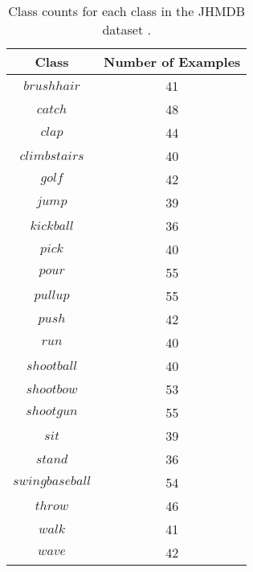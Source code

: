 \begin{table}[ht]
	\centering
	\begin{tabular}{||c c||} 
		\hline
		\textbf{Class} & \textbf{Number of Examples} \\ [0.5ex] 
		\hline\hline
		$brush hair$ & 41 \\ \hline
		$catch$ & 48 \\ \hline
		$clap$ & 44 \\ \hline
		$climb stairs$ & 40 \\ \hline
		$golf$ & 42 \\ \hline
		$jump$ & 39 \\ \hline
		$kick ball$ & 36 \\ \hline
		$pick$ & 40 \\ \hline
		$pour$ & 55 \\ \hline
		$pullup$ & 55 \\ \hline
		$push$ & 42 \\ \hline
		$run$ & 40 \\ \hline
		$shoot ball$ & 40 \\ \hline
		$shoot bow$ & 53 \\ \hline
		$shoot gun$ & 55 \\ \hline
		$sit$ & 39 \\ \hline
		$stand$ & 36 \\ \hline
		$swing baseball$ & 54 \\ \hline
		$throw$ & 46 \\ \hline
		$walk$ & 41 \\ \hline
		$wave$ & 42 \\ \hline
		\hline
	\end{tabular}
	\caption{Class counts for each class in the JHMDB dataset \cite{JHMDB}.}
	\label{tab:jhmdb-class-splits}
\end{table}

